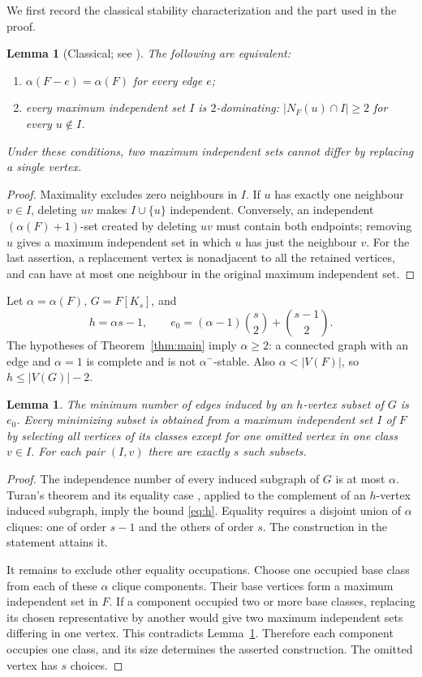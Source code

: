 \documentclass[11pt]{article}
\newtheorem{lemma}[theorem]{Lemma}
\theoremstyle{remark}\newtheorem{remark}[theorem]{Remark}
\begin{document}
We first record the classical stability characterization and the
part used in the proof.

\begin{lemma}[Classical; see \cite{LM}]\label{lem:stability}
The following are equivalent:
\begin{enumerate}
\item $\alpha(F-e)=\alpha(F)$ for every edge $e$;
\item every maximum independent set $I$ is $2$-dominating:
$|N_F(u)\cap I|\ge2$ for every $u\notin I$.
\end{enumerate}
Under these conditions, two maximum independent sets cannot differ
by replacing a single vertex.
\end{lemma}
\begin{proof}
Maximality excludes zero neighbours in $I$. If $u$ has exactly one
neighbour $v\in I$, deleting $uv$ makes $I\cup\{u\}$ independent.
Conversely, an independent $(\alpha(F)+1)$-set created by deleting
$uv$ must contain both endpoints; removing $u$ gives a maximum
independent set in which $u$ has just the neighbour $v$.
For the last assertion, a replacement vertex is nonadjacent to all
the retained vertices, and can have at most one neighbour in the
original maximum independent set.
\end{proof}

Let $\alpha=\alpha(F)$, $G=F[K_s]$, and
\begin{equation}
 h=\alpha s-1,\qquad
 e_0=(\alpha-1)\binom{s}{2}+\binom{s-1}{2}.        \label{eq:h}
\end{equation}
The hypotheses of Theorem~\ref{thm:main} imply $\alpha\ge2$:
a connected graph with an edge and $\alpha=1$ is complete and is
not $\alpha^-$-stable. Also $\alpha<|V(F)|$, so $h\le |V(G)|-2$.

\begin{lemma}\label{lem:ground}
The minimum number of edges induced by an $h$-vertex subset of $G$
is $e_0$. Every minimizing subset is obtained from a maximum
independent set $I$ of $F$ by selecting all vertices of its classes
except for one omitted vertex in one class $v\in I$.
For each pair $(I,v)$ there are exactly $s$ such subsets.
\end{lemma}
\begin{proof}
The independence number of every induced subgraph of $G$ is at
most $\alpha$. Turan's theorem and its equality case
\cite{Turan}, applied to the complement of an $h$-vertex induced
subgraph, imply the bound \eqref{eq:h}. Equality requires a
disjoint union of $\alpha$ cliques: one of order $s-1$ and the
others of order $s$. The construction in the statement attains it.

It remains to exclude other equality occupations. Choose one
occupied base class from each of these $\alpha$ clique components.
Their base vertices form a maximum independent set in $F$.
If a component occupied two or more base classes, replacing its
chosen representative by another would give two maximum
independent sets differing in one vertex. This contradicts
Lemma~\ref{lem:stability}. Therefore each component occupies one
class, and its size determines the asserted construction.
The omitted vertex has $s$ choices.
\end{proof}
\end{document}
